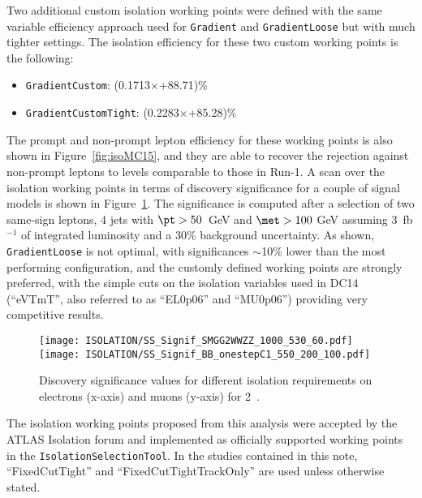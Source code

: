 Two additional custom isolation working points were defined with  the same variable efficiency approach used for {\tt Gradient} and {\tt GradientLoose} but with much tighter settings. The isolation efficiency for these two custom working points is the following:
\begin{itemize}
\item {\tt GradientCustom}: (0.1713$\times$\pt[GeV]+88.71)\%
\item {\tt GradientCustomTight}: (0.2283$\times$\pt[GeV]+85.28)\%
\end{itemize}
The prompt and non-prompt lepton efficiency for these working points is also shown in Figure~\ref{fig:isoMC15}, and they are able to recover the rejection against non-prompt leptons to levels comparable to those in Run-1. A scan over the isolation working points in terms of discovery significance for a couple of signal models is shown in Figure~\ref{fig:IsoScan}. The significance is computed after a selection of two same-sign leptons, 4 jets with $\pt >50$~GeV and $\met>100$ GeV assuming 3~fb$^{-1}$ of integrated luminosity and a 30\% background uncertainty. As shown, {\tt GradientLoose} is not optimal, with significances $\sim$10\% lower than the most performing configuration, and the customly defined working points are strongly preferred, with the simple cuts on the isolation variables used in DC14 (``eVTmT'', also referred to as ``EL0p06'' and ``MU0p06'') providing very competitive results.

\begin{figure}[phtb!]
\begin{center}
\texttt{[image: ISOLATION/SS\_Signif\_SMGG2WWZZ\_1000\_530\_60.pdf]}
\texttt{[image: ISOLATION/SS\_Signif\_BB\_onestepC1\_550\_200\_100.pdf]}
\end{center}
\vspace{-0.2cm}
\caption{Discovery significance values for different isolation requirements on electrons (x-axis) and muons (y-axis) for 2~\ifb. }
\label{fig:IsoScan}
\end{figure}

The isolation working points proposed from this analysis were accepted by the ATLAS Isolation forum and implemented as officially supported working points in the {\tt IsolationSelectionTool}. In the studies contained in this note, ``FixedCutTight'' and ``FixedCutTightTrackOnly'' are used unless otherwise stated.
